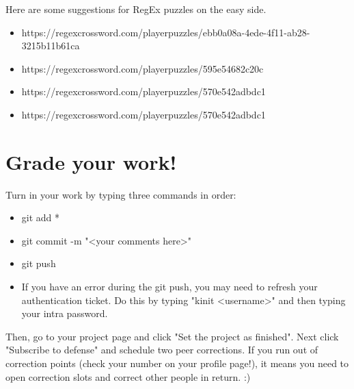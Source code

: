 \documentclass{42-en}
\begin{document}
Here are some suggestions for RegEx puzzles on the easy side.

\begin{itemize}
	\item https://regexcrossword.com/playerpuzzles/ebb0a08a-4ede-4f11-ab28-3215b11b61ca
	\item https://regexcrossword.com/playerpuzzles/595e54682c20c
	\item https://regexcrossword.com/playerpuzzles/570e542adbdc1
	\item https://regexcrossword.com/playerpuzzles/570e542adbdc1
\end{itemize}


\chapter{Grade your work!}

Turn in your work by typing three commands in order: 
\begin{itemize}
	\item git add *
	\item git commit -m "<your comments here>"
	\item git push
	\item If you have an error during the git push, you may need to refresh your authentication ticket. Do this by typing "kinit <username>" and then typing your intra password.
\end{itemize}

Then, go to your project page and click "Set the project as finished".
Next click "Subscribe to defense" and schedule two peer corrections.
If you run out of correction points (check your number on your profile page!), it means you need to open correction slots and correct other people in return. :)
\end{document}

